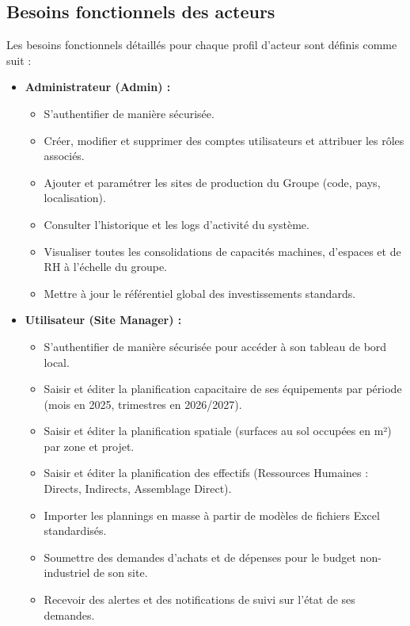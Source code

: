\subsection{Besoins fonctionnels des acteurs}

Les besoins fonctionnels détaillés pour chaque profil d'acteur sont définis comme suit :

\begin{itemize}
    \item [$-$] \textbf{Administrateur (Admin) :} 
    \begin{itemize}[label=\textbullet,font=\normalsize]
        \item S'authentifier de manière sécurisée.
        \item Créer, modifier et supprimer des comptes utilisateurs et attribuer les rôles associés.
        \item Ajouter et paramétrer les sites de production du Groupe (code, pays, localisation).
        \item Consulter l'historique et les logs d'activité du système.
        \item Visualiser toutes les consolidations de capacités machines, d'espaces et de RH à l'échelle du groupe.
        \item Mettre à jour le référentiel global des investissements standards.
    \end{itemize}
    
    \item [$-$] \textbf{Utilisateur (Site Manager) :}
    \begin{itemize}[label=\textbullet,font=\normalsize]
        \item S'authentifier de manière sécurisée pour accéder à son tableau de bord local.
        \item Saisir et éditer la planification capacitaire de ses équipements par période (mois en 2025, trimestres en 2026/2027).
        \item Saisir et éditer la planification spatiale (surfaces au sol occupées en m²) par zone et projet.
        \item Saisir et éditer la planification des effectifs (Ressources Humaines : Directs, Indirects, Assemblage Direct).
        \item Importer les plannings en masse à partir de modèles de fichiers Excel standardisés.
        \item Soumettre des demandes d'achats et de dépenses pour le budget non-industriel de son site.
        \item Recevoir des alertes et des notifications de suivi sur l'état de ses demandes.
    \end{itemize}
    

\end{itemize}
